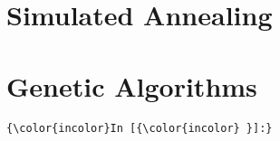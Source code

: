 \documentclass[11pt]{article}
\begin{document}
    \section{Simulated Annealing}\label{simulated-annealing}

    \section{Genetic Algorithms}\label{genetic-algorithms}

    \begin{Verbatim}[commandchars=\\\{\}]
{\color{incolor}In [{\color{incolor} }]:} 
\end{Verbatim}


    
    
    
    
\end{document}
